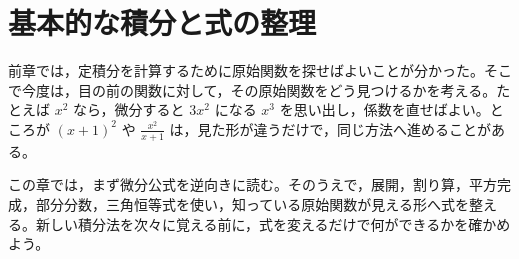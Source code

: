 \chapter{基本的な積分と式の整理}\label{章:基本積分}

前章では，定積分を計算するために原始関数を探せばよいことが分かった。そこで今度は，目の前の関数に対して，その原始関数をどう見つけるかを考える。たとえば $x^2$ なら，微分すると $3x^2$ になる $x^3$ を思い出し，係数を直せばよい。ところが $(x+1)^2$ や $\frac{x^2}{x+1}$ は，見た形が違うだけで，同じ方法へ進めることがある。

この章では，まず微分公式を逆向きに読む。そのうえで，展開，割り算，平方完成，部分分数，三角恒等式を使い，知っている原始関数が見える形へ式を整える。新しい積分法を次々に覚える前に，式を変えるだけで何ができるかを確かめよう。

%
%
%
%
%
%
%
